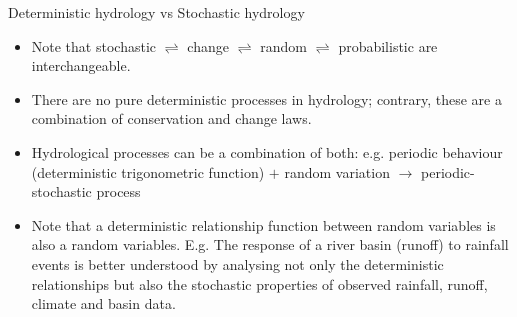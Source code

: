 \documentclass[8pt]{beamer}
\renewcommand{\emph}[1]{\textcolor{myorange}{#1}}
\begin{document}
\begin{frame}{Deterministic hydrology vs Stochastic hydrology}
    
   \begin{itemize}
        \item Note that \emph{stochastic} $\rightleftharpoons$ \emph{change} $\rightleftharpoons$ \emph{random} $\rightleftharpoons$ \emph{probabilistic} are interchangeable. 
        \item There are no pure deterministic processes in hydrology; contrary, these are a combination of conservation and change laws.  
        \item Hydrological processes can be a combination of both: e.g. periodic behaviour (deterministic trigonometric function) $+$ random variation  $\rightarrow$ \alert{periodic-stochastic process}
        \item Note that a deterministic relationship function between random variables is also a random variables. E.g. The response of a river basin (runoff) to rainfall events is better understood by analysing not only the deterministic relationships but also the stochastic properties of observed rainfall, runoff, climate and basin data. 
    \end{itemize}
\end{frame}
\end{document}
